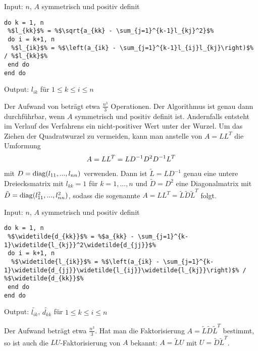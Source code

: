 \begin{algorithm}
	Input: $n$, $A$ symmetrisch und positiv definit
	\begin{lstlisting}
do k = 1, n
 %$l_{kk}$% = %$\sqrt{a_{kk} - \sum_{j=1}^{k-1}l_{kj}^2}$%
 do i = k+1, n
  %$l_{ik}$% = %$\left(a_{ik} - \sum_{j=1}^{k-1}l_{ij}l_{kj}\right)$% / %$l_{kk}$%
 end do
end do
	\end{lstlisting}
	Output: $l_{ik}$ für $1\le k\le i\le n$
\end{algorithm}

\begin{remark}
	Der Aufwand von  beträgt etwa $\frac{n^3}{3}$ Operationen. Der Algorithmus ist genau dann durchführbar, wenn $A$ symmetrisch und positiv definit ist. Andernfalls entsteht im Verlauf des Verfahrens ein nicht-positiver Wert unter der Wurzel. Um das Ziehen der Quadratwurzel zu vermeiden, kann man anstelle von $A=LL^T$ die Umformung
	\begin{align}
		A = LL^T = LD^{-1}D^2D^{-1}L^T\notag
	\end{align}
	mit $D = \operatorname{diag}(l_{11},...,l_{nn})$ verwenden. Dann ist $\tilde{L}=LD^{-1}$ genau eine untere Dreiecksmatrix mit $l_{kk}=1$ für $k=1,...,n$ und $\tilde{D}=D^2$ eine Diagonalmatrix mit $\tilde{D}=\operatorname{diag}(l_{11}^2,...,l_{nn}^2)$, sodass die sogenannte  $A=LL^T=\tilde{L}\tilde{D}\tilde{L}^T$ folgt.
\end{remark}

\begin{algorithm}
	Input: $n$, $A$ symmetrisch und positiv definit
	\begin{lstlisting}
do k = 1, n
 %$\widetilde{d_{kk}}$% = %$a_{kk} - \sum_{j=1}^{k-1}\widetilde{l_{kj}}^2\widetilde{d_{jj}}$%
 do i = k+1, n
  %$\widetilde{l_{ik}}$% = %$\left(a_{ik} - \sum_{j=1}^{k-1}\widetilde{d_{jj}}\widetilde{l_{ij}}\widetilde{l_{kj}}\right)$% / %$\widetilde{d_{kk}}$%
 end do
end do
	\end{lstlisting}
	Output: $\widetilde{l_{ik}}$, $\widetilde{d_{kk}}$ für $1\le k\le i\le n$
\end{algorithm}

Der Aufwand beträgt etwa $\frac{n^3}{3}$. Hat man die Faktorisierung $A=\tilde{L}\tilde{D}\tilde{L}^T$ bestimmt, so ist auch die $LU$-Faktorisierung von $A$ bekannt: $A=\tilde{L}U$ mit $U=\tilde{D}\tilde{L}^T$.